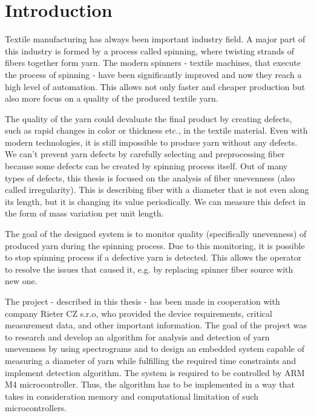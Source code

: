 \documentclass[twoside]{ctuthesis}
\theoremstyle{plain}
\theoremstyle{definition}
\theoremstyle{note}
\begin{document}
	
\maketitle

\chapter{Introduction}
Textile manufacturing has always been important industry field. A major part of this industry is formed by a process called spinning, where twisting strands of fibers together form yarn. The modern spinners - textile machines, that execute the process of spinning - have been significantly improved and now they reach a high level of automation. This allows not only faster and cheaper production but also more focus on a quality of the produced textile yarn. 

The quality of the yarn could devaluate the final product by creating defects, such as rapid changes in color or thickness etc., in the textile material. Even with modern technologies, it is still impossible to produce yarn without any defects. We can't prevent yarn defects by carefully selecting and preprocessing fiber because some defects can be created by spinning process itself. Out of many types of defects, this thesis is focused on the analysis of fiber unevenness (also called irregularity). This is describing fiber with a diameter that is not even along its length, but it is changing its value periodically. We can measure this defect in the form of mass variation per unit length.

The goal of the designed system is to monitor quality (specifically unevenness) of produced yarn during the spinning process. Due to this monitoring, it is possible to stop spinning process if a defective yarn is detected. This allows the operator to resolve the issues that caused it, e.g. by replacing spinner fiber source with new one.

The project - described in this thesis - has been made in cooperation with company Rieter CZ s.r.o, who provided the device requirements, critical measurement data, and other important information. The goal of the project was to research and develop an algorithm for analysis and detection of yarn unevenness by using spectrograms and to design an embedded system capable of measuring a diameter of yarn while fulfilling the required time constraints and implement detection algorithm. The system is required to be controlled by ARM M4 microcontroller. Thus, the algorithm has to be implemented in a way that takes in consideration memory and computational limitation of such microcontrollers.
\end{document}
